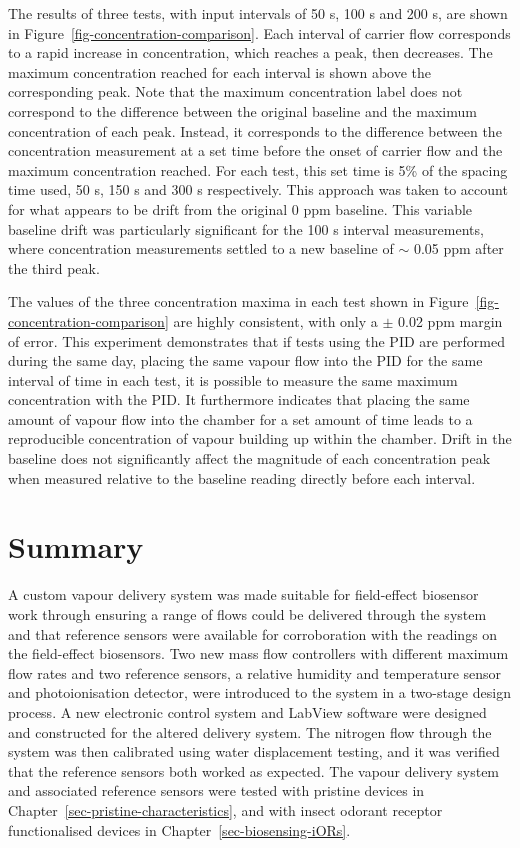 \documentclass[
  a4paper,
]{scrbook}
\begin{document}
The results of three tests, with input intervals of 50 s, 100 s and 200
s, are shown in Figure~\ref{fig-concentration-comparison}. Each interval
of carrier flow corresponds to a rapid increase in concentration, which
reaches a peak, then decreases. The maximum concentration reached for
each interval is shown above the corresponding peak. Note that the
maximum concentration label does not correspond to the difference
between the original baseline and the maximum concentration of each
peak. Instead, it corresponds to the difference between the
concentration measurement at a set time before the onset of carrier flow
and the maximum concentration reached. For each test, this set time is
5\% of the spacing time used, 50 s, 150 s and 300 s respectively. This
approach was taken to account for what appears to be drift from the
original 0 ppm baseline. This variable baseline drift was particularly
significant for the 100 s interval measurements, where concentration
measurements settled to a new baseline of \(\sim\) 0.05 ppm after the
third peak.

The values of the three concentration maxima in each test shown in
Figure~\ref{fig-concentration-comparison} are highly consistent, with
only a \(\pm\) 0.02 ppm margin of error. This experiment demonstrates
that if tests using the PID are performed during the same day, placing
the same vapour flow into the PID for the same interval of time in each
test, it is possible to measure the same maximum concentration with the
PID. It furthermore indicates that placing the same amount of vapour
flow into the chamber for a set amount of time leads to a reproducible
concentration of vapour building up within the chamber. Drift in the
baseline does not significantly affect the magnitude of each
concentration peak when measured relative to the baseline reading
directly before each interval.

\hypertarget{summary-3}{%
\section{Summary}\label{summary-3}}

A custom vapour delivery system was made suitable for field-effect
biosensor work through ensuring a range of flows could be delivered
through the system and that reference sensors were available for
corroboration with the readings on the field-effect biosensors. Two new
mass flow controllers with different maximum flow rates and two
reference sensors, a relative humidity and temperature sensor and
photoionisation detector, were introduced to the system in a two-stage
design process. A new electronic control system and LabView software
were designed and constructed for the altered delivery system. The
nitrogen flow through the system was then calibrated using water
displacement testing, and it was verified that the reference sensors
both worked as expected. The vapour delivery system and associated
reference sensors were tested with pristine devices in
Chapter~\ref{sec-pristine-characteristics}, and with insect odorant
receptor functionalised devices in Chapter~\ref{sec-biosensing-iORs}.
\end{document}
